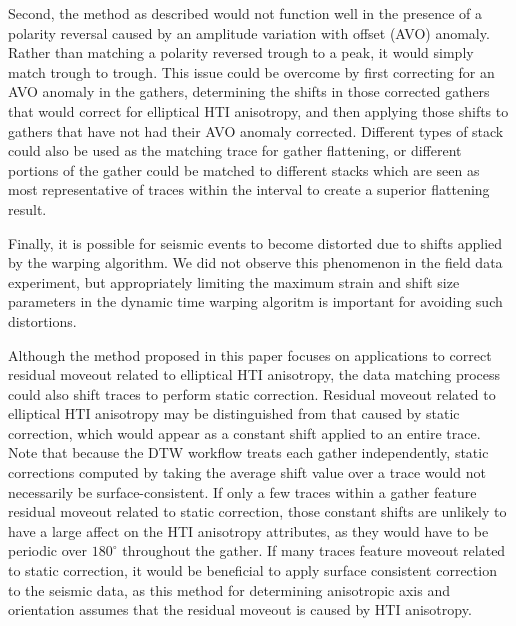 Second, the method as described would not function well in the presence of a polarity reversal caused by an amplitude variation with offset (AVO) anomaly. Rather than matching a polarity reversed trough to a peak, it would simply match trough to trough.  This issue could be overcome by first correcting for an AVO anomaly in the gathers, determining the shifts in those corrected gathers that would correct for elliptical HTI anisotropy, and then applying those shifts to gathers that have not had their AVO anomaly corrected.  Different types of stack could also be used as the matching trace for gather flattening, or different portions of the gather could be matched to different stacks which are seen as most representative of traces within the interval to create a superior flattening result.  

Finally, it is possible for seismic events to become distorted due to shifts applied by the warping algorithm.  We did not observe this phenomenon in the field data experiment, but appropriately limiting the maximum strain and shift size parameters in the dynamic time warping algoritm is important for avoiding such distortions.

Although the method proposed in this paper focuses on applications to correct residual moveout related to elliptical HTI anisotropy, the data matching process could also shift traces to perform static correction.  Residual moveout related to elliptical HTI anisotropy may be distinguished from that caused by static correction, which would appear as a constant shift applied to an entire trace. Note that because the DTW workflow treats each gather independently, static corrections computed by taking the average shift value over a trace would not necessarily be surface-consistent.  If only a few traces within a gather feature residual moveout related to static correction, those constant shifts are unlikely to have a large affect on the HTI anisotropy attributes, as they would have to be periodic over $180^\circ$ throughout the gather.  If many traces feature moveout related to static correction, it would be beneficial to apply surface consistent correction to the seismic data, as this method for determining anisotropic axis and orientation assumes that the residual moveout is caused by HTI anisotropy.

